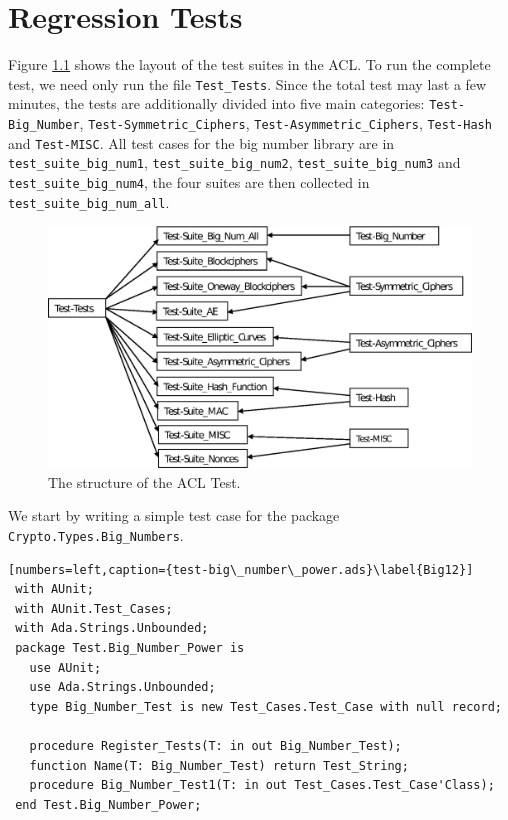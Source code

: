 \chapter{Regression Tests}
Figure \ref{ACLTEST} shows the layout of the test suites in the
ACL. To run the complete test, we need only run the file
\texttt{Test\_Tests}. Since the total test may last a few minutes, the
tests are additionally divided into five main categories:
\texttt{Test-Big\_Number}, \texttt{Test-Symmetric\_Ciphers},
\texttt{Test-Asymmetric\_Ciphers}, \texttt{Test-Hash} and
\texttt{Test-MISC}. All test cases for the big number library are in
\texttt{test\_suite\_big\_num1}, \texttt{test\_suite\_\-big\_num2},
\texttt{test\_suite\_big\_num3} and \texttt{test\_suite\_big\_num4},
the four suites are then collected in
\texttt{test\_suite\_big\_num\_all}.
\begin{figure}[h]
  \includegraphics[scale=0.8]{./images/Layout_of_Test_Suite} 
  \caption{The structure of the ACL Test.}\label{ACLTEST}
\end{figure}

We start by writing a simple test case for the package
\texttt{Crypto.Types.Big\_Numbers}.
\begin{lstlisting}[numbers=left,caption={test-big\_number\_power.ads}\label{Big12}]
 with AUnit;
 with AUnit.Test_Cases;
 with Ada.Strings.Unbounded;  
 package Test.Big_Number_Power is
   use AUnit;
   use Ada.Strings.Unbounded;
   type Big_Number_Test is new Test_Cases.Test_Case with null record;
 
   procedure Register_Tests(T: in out Big_Number_Test);
   function Name(T: Big_Number_Test) return Test_String;
   procedure Big_Number_Test1(T: in out Test_Cases.Test_Case'Class);
 end Test.Big_Number_Power;
\end{lstlisting}

